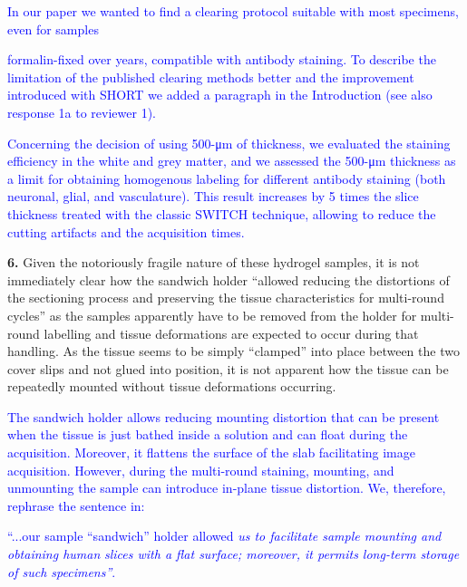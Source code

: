 \documentclass{article}
\newcommand{\reply}[1]{\textcolor{blue}{#1}}
\begin{document}
\noindent \reply{In our paper we wanted to find a clearing protocol suitable with most specimens, even for samples}

\noindent {}\reply{formalin-fixed over years, compatible with antibody staining. To describe the limitation of the} \reply{published clearing methods better and the improvement introduced with SHORT we added a} \reply{paragraph in the Introduction (see also response 1a to reviewer 1).}

\noindent \reply{Concerning the decision of using 500-μm of thickness, we evaluated the staining efficiency in the} \reply{white and grey matter, and we assessed the 500-μm thickness as a limit for obtaining homogenous} \reply{labeling for different antibody staining (both neuronal, glial, and vasculature). This result increases} \reply{by 5 times the slice thickness treated with the classic SWITCH technique, allowing to reduce the} \reply{cutting artifacts and the acquisition times.}

\noindent \textbf{6.} Given the notoriously fragile nature of these hydrogel samples, it is not immediately clear how the sandwich holder “allowed reducing the distortions of the sectioning process and preserving the tissue characteristics for multi-round cycles” as the samples apparently have to be removed from the holder for multi-round labelling and tissue deformations are expected to occur during that handling. As the tissue seems to be simply “clamped” into place between the two cover slips and not glued into position, it is not apparent how the tissue can be repeatedly mounted without tissue deformations occurring.

\noindent \reply{The sandwich holder allows reducing mounting distortion that can be present when the tissue is} \reply{just bathed inside a solution and can float during the acquisition. Moreover, it flattens the surface of} \reply{the slab facilitating image acquisition. However, during the multi-round staining, mounting, and} \reply{unmounting the sample can introduce in-plane tissue distortion. We, therefore, rephrase the} \reply{sentence in:}

\noindent \reply{“...our sample “sandwich” holder allowed} \reply{\emph{us to facilitate sample mounting and obtaining human}} \reply{\emph{slices with a flat surface; moreover, it permits long-term storage of such specimens”}}\reply{.}
\end{document}
